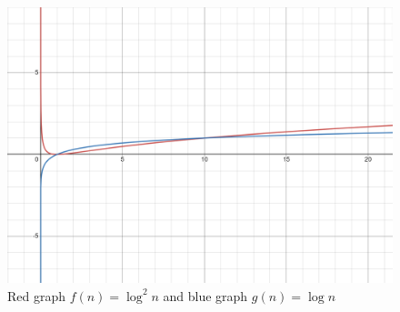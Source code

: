 \documentclass[a4]{scrartcl}
\begin{document}
\begin{figure}[H]
\begin{center}
\includegraphics[scale=0.3]{images/logplot.png}
\caption{Red graph $f(n) = \log ^2 n$ and blue graph $g(n)= \log n$}
\end{center}
\end{figure}



\color{black}












\newpage

\printbibliography
\end{document}
